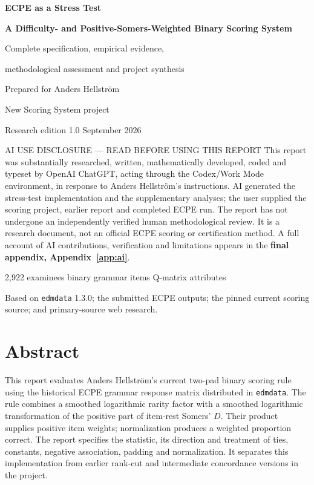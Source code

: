 \documentclass[11pt,a4paper,oneside,headings=normal,parskip=half]{scrreprt}
\newcommand{\code}[1]{\nolinkurl{#1}}
\begin{document}
\begin{titlepage}
\centering
\vspace*{10mm}
{\sffamily\bfseries\color{ink}\Huge ECPE as a Stress Test\par}
\vspace{5mm}
{\sffamily\bfseries\LARGE A Difficulty- and Positive-Somers-Weighted Binary Scoring System\par}
\vspace{7mm}
{\Large Complete specification, empirical evidence,\par methodological assessment and project synthesis\par}
\vspace{9mm}
{\large Prepared for Anders Hellström\par}
{\large New Scoring System project\par}
\vspace{4mm}
{\large Research edition 1.0 \quad September 2026\par}
\vspace{10mm}
\begin{caution}{AI USE DISCLOSURE — READ BEFORE USING THIS REPORT}
This report was substantially researched, written, mathematically developed, coded and typeset by OpenAI ChatGPT, acting through the Codex/Work Mode environment, in response to Anders Hellström's instructions. AI generated the stress-test implementation and the supplementary analyses; the user supplied the scoring project, earlier report and completed ECPE run. The report has not undergone an independently verified human methodological review. It is a research document, not an official ECPE scoring or certification method. A full account of AI contributions, verification and limitations appears in the \textbf{final appendix, Appendix~\ref{app:ai}}.
\end{caution}
\vfill
{\large 2,922 examinees  binary grammar items  Q-matrix attributes\par}
\vspace{5mm}
{\small Based on \code{edmdata} 1.3.0; the submitted ECPE outputs; the pinned current scoring source; and primary-source web research.\par}
\end{titlepage}
\chapter*{Abstract}
This report evaluates Anders Hellström's current two-pad binary scoring rule using the historical ECPE grammar response matrix distributed in \code{edmdata}. The rule combines a smoothed logarithmic rarity factor with a smoothed logarithmic transformation of the positive part of item-rest Somers' $D$. Their product supplies positive item weights; normalization produces a weighted proportion correct. The report specifies the statistic, its direction and treatment of ties, constants, negative association, padding and normalization. It separates this implementation from earlier rank-cut and intermediate concordance versions in the project.
\end{document}
